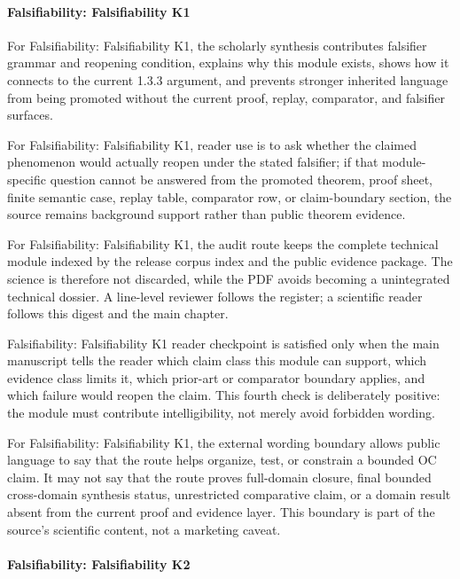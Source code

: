 \paragraph{Falsifiability: Falsifiability K1}

For Falsifiability: Falsifiability K1, the scholarly synthesis contributes falsifier grammar and reopening condition, explains why this module exists, shows how it connects to the current 1.3.3 argument, and prevents stronger inherited language from being promoted without the current proof, replay, comparator, and falsifier surfaces.


For Falsifiability: Falsifiability K1, reader use is to ask whether the claimed phenomenon would actually reopen under the stated falsifier; if that module-specific question cannot be answered from the promoted theorem, proof sheet, finite semantic case, replay table, comparator row, or claim-boundary section, the source remains background support rather than public theorem evidence.


For Falsifiability: Falsifiability K1, the audit route keeps the complete technical module indexed by the release corpus index and the public evidence package. The science is therefore not discarded, while the PDF avoids becoming a unintegrated technical dossier. A line-level reviewer follows the register; a scientific reader follows this digest and the main chapter.


Falsifiability: Falsifiability K1 reader checkpoint is satisfied only when the main manuscript tells the reader which claim class this module can support, which evidence class limits it, which prior-art or comparator boundary applies, and which failure would reopen the claim. This fourth check is deliberately positive: the module must contribute intelligibility, not merely avoid forbidden wording.


For Falsifiability: Falsifiability K1, the external wording boundary allows public language to say that the route helps organize, test, or constrain a bounded OC claim. It may not say that the route proves full-domain closure, final bounded cross-domain synthesis status, unrestricted comparative claim, or a domain result absent from the current proof and evidence layer. This boundary is part of the source's scientific content, not a marketing caveat.


\paragraph{Falsifiability: Falsifiability K2}

